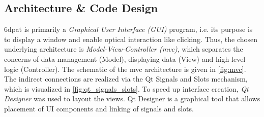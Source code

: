 \subsection{Architecture \& Code Design}

\gls{6dpat} is primarily a \textit{Graphical User Interface (GUI)} program, i.e. its purpose is to display a window and enable optical interaction like clicking. Thus, the chosen underlying architecture is \textit{Model-View-Controller (\gls{mvc})}, which separates the concerns of data management (Model), displaying data (View) and high level logic (Controller). The schematic of the \gls{mvc} architecture is given in \fig \ref{fig:mvc}. The indirect connections are realized via the Qt Signals and Slots mechanism, which is visualized in \fig \ref{fig:qt_signals_slots}. To speed up interface creation, \textit{Qt Designer} was used to layout the views. Qt Designer is a graphical tool that allows placement of UI components and linking of signals and slots. \\

